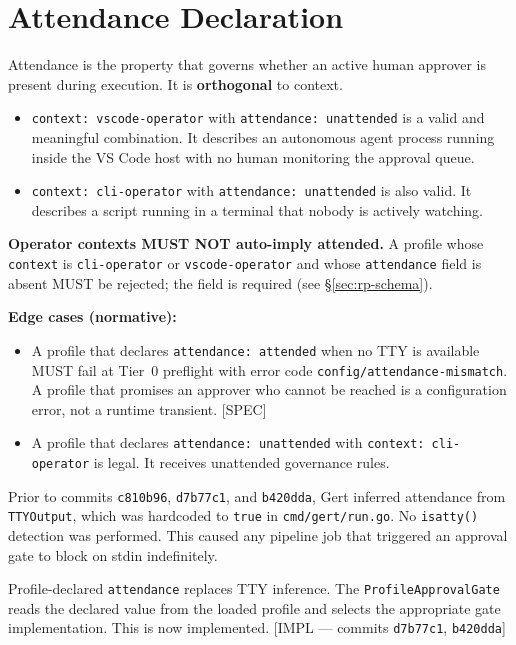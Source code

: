 \section{Attendance Declaration}
\label{sec:rp-attendance}

Attendance is the property that governs whether an active human approver is
present during execution.  It is \textbf{orthogonal} to context.

\begin{itemize}[noitemsep]
  \item \texttt{context: vscode-operator} with \texttt{attendance: unattended}
        is a valid and meaningful combination.  It describes an autonomous agent
        process running inside the VS Code host with no human monitoring the
        approval queue.
  \item \texttt{context: cli-operator} with \texttt{attendance: unattended}
        is also valid.  It describes a script running in a terminal that nobody
        is actively watching.
\end{itemize}

\textbf{Operator contexts MUST NOT auto-imply attended.}  A profile whose
\texttt{context} is \texttt{cli-operator} or \texttt{vscode-operator} and whose
\texttt{attendance} field is absent MUST be rejected; the field is required (see
\S\ref{sec:rp-schema}).

\textbf{Edge cases (normative):}

\begin{itemize}[noitemsep]
  \item A profile that declares \texttt{attendance: attended} when no TTY is
        available MUST fail at Tier~0 preflight with error code
        \texttt{config/attendance-mismatch}.  A profile that promises an
        approver who cannot be reached is a configuration error, not a
        runtime transient.  [SPEC]
  \item A profile that declares \texttt{attendance: unattended} with
        \texttt{context: cli-operator} is legal.  It receives unattended
        governance rules.
\end{itemize}

\begin{tcolorbox}[colback=blue!5, colframe=blue!40, title=Non-Normative Note — Attendance Implementation History]
  Prior to commits \texttt{c810b96}, \texttt{d7b77c1}, and \texttt{b420dda},
  Gert inferred attendance from \texttt{TTYOutput}, which was hardcoded to
  \texttt{true} in \texttt{cmd/gert/run.go}.  No \texttt{isatty()} detection
  was performed.  This caused any pipeline job that triggered an approval gate
  to block on stdin indefinitely.

  Profile-declared \texttt{attendance} replaces TTY inference.  The
  \texttt{ProfileApprovalGate} reads the declared value from the loaded profile
  and selects the appropriate gate implementation.  This is now implemented.
  [IMPL — commits \texttt{d7b77c1}, \texttt{b420dda}]
\end{tcolorbox}

